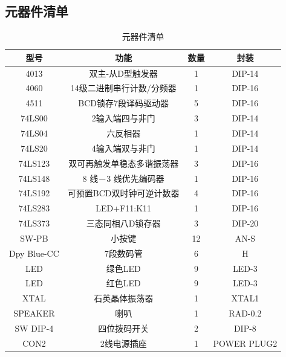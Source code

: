 \documentclass{../source/Experiment}
\begin{document}
        \subsection{元器件清单}
            \begin{table}[H]
                \centering
                \caption{元器件清单}
                \begin{tabular}{|c|c|c|c|}
                    \hline
                    型号          & 功能             & 数量 & 封装          \\ \hline
                    4013        & 双主-从D型触发器      & 1  & DIP-14      \\ \hline
                    4060        & 14级二进制串行计数/分频器 & 1  & DIP-16      \\ \hline
                    4511        & BCD锁存7段译码驱动器   & 5  & DIP-16      \\ \hline
                    74LS00      & 2输入端四与非门       & 3  & DIP-14      \\ \hline
                    74LS04      & 六反相器           & 1  & DIP-14      \\ \hline
                    74LS20      & 4输入端双与非门       & 1  & DIP-14      \\ \hline
                    74LS123     & 双可再触发单稳态多谐振荡器  & 3  & DIP-16      \\ \hline
                    74LS148     & 8 线－3 线优先编码器   & 1  & DIP-16      \\ \hline
                    74LS192     & 可预置BCD双时钟可逆计数器 & 4  & DIP-16      \\ \hline
                    74LS283     & LED+F11:K11    & 1  & DIP-16      \\ \hline
                    74LS373     & 三态同相八D锁存器      & 3  & DIP-20      \\ \hline
                    SW-PB       & 小按键            & 12 & AN-S        \\ \hline
                    Dpy Blue-CC & 7段数码管          & 6  & H           \\ \hline
                    LED         & 绿色LED          & 9  & LED-3       \\ \hline
                    LED         & 红色LED          & 9  & LED-3       \\ \hline
                    XTAL        & 石英晶体振荡器        & 1  & XTAL1       \\ \hline
                    SPEAKER     & 喇叭             & 1  & RAD-0.2     \\ \hline
                    SW DIP-4    & 四位拨码开关         & 2  & DIP-8       \\ \hline
                    CON2        & 2线电源插座         & 1  & POWER PLUG2 \\ \hline
                \end{tabular}
            \end{table}
\end{document}
